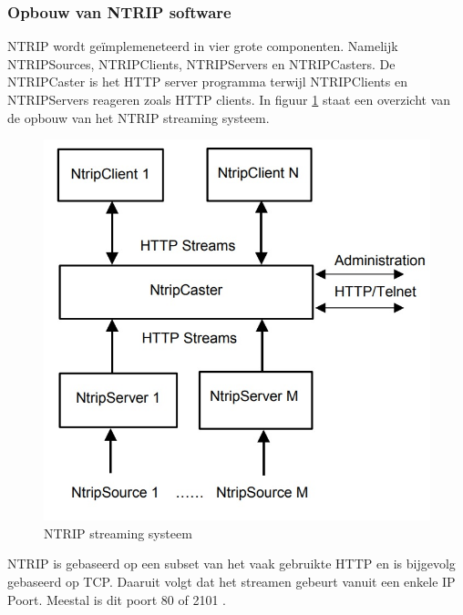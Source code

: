 \subsubsection{Opbouw van NTRIP software}
\label{LONS}
NTRIP wordt ge\"implemeneteerd in vier grote componenten. Namelijk NTRIPSources, NTRIPClients, NTRIPServers en NTRIPCasters. De NTRIPCaster is het HTTP server programma terwijl NTRIPClients en NTRIPServers reageren zoals HTTP clients\cite{LBibNTRIP}.  In figuur \ref{imgNTRIP} staat een overzicht van de opbouw van het NTRIP streaming systeem.

\begin{figure}[hpb]
	\includegraphics[scale=0.55]{NTRIP.jpg}
	\caption{NTRIP streaming systeem \cite{LBibNTRIP}}
	\label{imgNTRIP}
\end{figure} 
NTRIP is gebaseerd op een subset van het vaak gebruikte HTTP en is bijgevolg gebaseerd op TCP. Daaruit volgt dat het streamen gebeurt vanuit een enkele IP Poort. Meestal is dit poort 80 of 2101 \cite{LBibNTRIP3}. 


